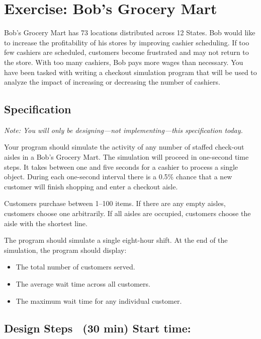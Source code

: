 \section*{Exercise: Bob's Grocery Mart}

Bob's Grocery Mart has 73 locations distributed across 12 States.
Bob would like to increase the profitability of his stores by improving cashier scheduling.
If too few cashiers are scheduled, customers become frustrated and may not return to the store.
With too many cashiers, Bob pays more wages than necessary.
You have been tasked with writing a checkout simulation program that will be used to analyze the impact of increasing or decreasing the number of cashiers.


\subsection*{Specification}

\textit{Note: You will only be designing---not implementing---this specification today.}

\bigskip

Your program should simulate the activity of any number of staffed check-out aisles in a Bob's Grocery Mart.
The simulation will proceed in one-second time steps.
It takes between one and five seconds for a cashier to process a single object.
During each one-second interval there is a 0.5\% chance that a new customer will finish shopping and enter a checkout aisle.

\bigskip

Customers purchase between 1--100 items.
If there are any empty aisles, customers choose one arbitrarily.
If all aisles are occupied, customers choose the aisle with the shortest line.

\bigskip

The program should simulate a single eight-hour shift.
At the end of the simulation, the program should display:

\begin{itemize}[itemsep=1ex]
\item The total number of customers served.
\item The average wait time across all customers.
\item The maximum wait time for any individual customer.
\end{itemize}


\subsection*{Design Steps~ (30 min) \hfill Start time: \ans[3.5em]}

